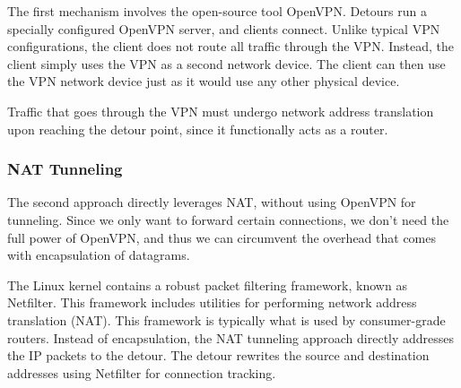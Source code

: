 The first mechanism involves the open-source tool OpenVPN. Detours run a
specially configured OpenVPN server, and clients connect. Unlike typical VPN
configurations, the client does not route all traffic through the VPN. Instead,
the client simply uses the VPN as a second network device. The client can then
use the VPN network device just as it would use any other physical device.

Traffic that goes through the VPN must undergo network address translation upon
reaching the detour point, since it functionally acts as a router.

\subsubsection{NAT Tunneling}

The second approach directly leverages NAT, without using OpenVPN for tunneling.
Since we only want to forward certain connections, we don't need the full power
of OpenVPN, and thus we can circumvent the overhead that comes with
encapsulation of datagrams.

The Linux kernel contains a robust packet filtering framework, known as
Netfilter. This framework includes utilities for performing network address
translation (NAT). This framework is typically what is used by consumer-grade
routers. Instead of encapsulation, the NAT tunneling approach directly addresses
the IP packets to the detour. The detour rewrites the source and destination
addresses using Netfilter for connection tracking.
